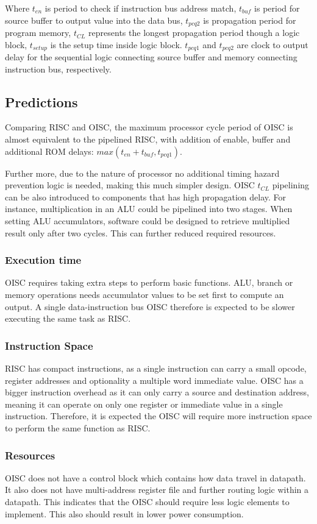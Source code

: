 Where $t_{en}$ is period to check if instruction bus address match, $t_{buf}$ is period for source buffer to output value into the data bus, $t_{pcq2}$ is propagation period for program memory, $t_{CL}$ represents the longest propagation period though a logic block, $t_{setup}$ is the setup time inside logic block. $t_{pcq1}$ and $t_{pcq2}$ are clock to output delay for the sequential logic connecting source buffer and memory connecting instruction bus, respectively. 

\subsection{Predictions}

Comparing RISC and OISC, the maximum processor cycle period of OISC is almost equivalent to the pipelined RISC, with addition of enable, buffer and additional ROM delays: $max \left( t_{en} + t_{buf}, t_{pcq1}\right)$.

Further more, due to the nature of processor no additional timing hazard prevention logic is needed, making this much simpler design. OISC $t_{CL}$ pipelining can be also introduced to components that has high propagation delay. For instance, multiplication in an ALU could be pipelined into two stages. When setting ALU accumulators, software could be designed to retrieve multiplied result only after two cycles. This can further reduced required resources.

\subsubsection{Execution time}
OISC requires taking extra steps to perform basic functions. ALU, branch or memory operations needs accumulator values to be set first to compute an output. A single data-instruction bus OISC therefore is expected to be slower executing the same task as RISC.

\subsubsection{Instruction Space}
RISC has compact instructions, as a single instruction can carry a small opcode, register addresses and optionality a multiple word immediate value. OISC has a bigger instruction overhead as it can only carry a source and destination address, meaning it can operate on only one register or immediate value in a single instruction. Therefore, it is expected the OISC will require more instruction space to perform the same function as RISC.

\subsubsection{Resources}
OISC does not have a control block which contains how data travel in datapath. It also does not have multi-address register file and further routing logic within a datapath. This indicates that the OISC should require less logic elements to implement. This also should result in lower power consumption. 
